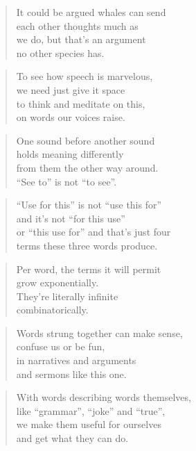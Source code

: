\documentclass[10pt,a4paper]{article}
\begin{document}
\begin{paracol}{2}
\begin{verse}
It could be argued whales can send\\
each other thoughts much as\\
we do, but that’s an argument\\
no other species has.
\end{verse}

\begin{verse}
To see how speech is marvelous,\\
we need just give it space\\
to think and meditate on this,\\
on words our voices raise.
\end{verse}

\begin{verse}
One sound before another sound\\
holds meaning differently\\
from them the other way around.\\
“See to” is not “to see”.
\end{verse}

\begin{verse}
“Use for this” is not “use this for”\\
and it’s not “for this use”\\
or “this use for” and that’s just four\\
terms these three words produce.
\end{verse}

\begin{verse}
Per word, the terms it will permit\\
grow exponentially.\\
They’re literally infinite\\
combinatorically.
\end{verse}

\begin{verse}
Words strung together can make sense,\\
confuse us or be fun,\\
in narratives and arguments\\
and sermons like this one.
\end{verse}

\begin{verse}
With words describing words themselves,\\
like “grammar”, “joke” and “true”,\\
we make them useful for ourselves\\
and get what they can do.
\end{verse}


\end{paracol}
\end{document}
